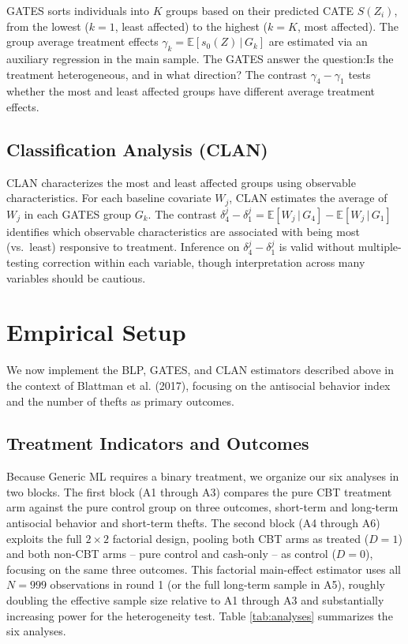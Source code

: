 \documentclass[11pt]{article}
\begin{document}
GATES sorts individuals into $K$ groups based on their predicted CATE
$S(Z_i)$, from the lowest ($k=1$, least affected) to the highest ($k=K$,
most affected). The group average treatment effects $\gamma_k =
\mathbb{E}[s_0(Z)\,|\,G_k]$ are estimated via an auxiliary regression in the
main sample. The GATES answer the question:Is the treatment
heterogeneous, and in what direction? The contrast $\gamma_4 - \gamma_1$
tests whether the most and least affected groups have different average
treatment effects.

\subsection{Classification Analysis (CLAN)}

CLAN characterizes the most and least affected groups using observable
characteristics. For each baseline covariate $W_j$, CLAN estimates the
average of $W_j$ in each GATES group $G_k$. The contrast $\delta_4^j -
\delta_1^j = \mathbb{E}[W_j\,|\,G_4] - \mathbb{E}[W_j\,|\,G_1]$ identifies
which observable characteristics are associated with being most (vs.~least)
responsive to treatment. Inference on $\delta_4^j - \delta_1^j$ is valid
without multiple-testing correction within each variable, though interpretation
across many variables should be cautious.

\section{Empirical Setup}
We now implement the BLP, GATES, and CLAN estimators described above in the context of Blattman et al. (2017), focusing on the antisocial behavior index and the number of thefts as primary outcomes.
\label{sec:setup}

\subsection{Treatment Indicators and Outcomes}

Because Generic ML requires a binary treatment, we organize our six analyses in two blocks. The first block (A1 through A3) compares the pure CBT treatment arm against the pure control group on three outcomes, short-term and long-term antisocial behavior and short-term thefts. The second block (A4 through A6) exploits the full $2\times 2$ factorial design, pooling both CBT arms as treated ($D=1$) and both non-CBT arms -- pure control and cash-only -- as control ($D=0$), focusing on the same three outcomes. This factorial main-effect estimator uses all $N= 999$ observations in round 1 (or the full long-term sample in A5), roughly doubling the effective sample size relative to A1 through A3 and substantially increasing power for the heterogeneity test. Table \ref{tab:analyses} summarizes the six analyses.
\end{document}
